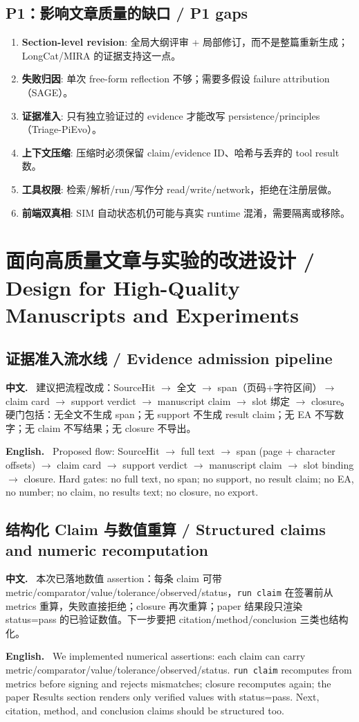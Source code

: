 \documentclass[UTF8,11pt]{ctexart}
\newcommand{\zh}{\par\noindent\textbf{中文.}\ }
\newcommand{\en}{\par\noindent\textbf{English.}\ }
\begin{document}
\subsection{P1：影响文章质量的缺口 / P1 gaps}
\begin{enumerate}[leftmargin=1.4em]
\item \textbf{Section-level revision}: 全局大纲评审 + 局部修订，而不是整篇重新生成；LongCat/MIRA 的证据支持这一点。
\item \textbf{失败归因}: 单次 free-form reflection 不够；需要多假设 failure attribution（SAGE）。
\item \textbf{证据准入}: 只有独立验证过的 evidence 才能改写 persistence/principles（Triage-PiEvo）。
\item \textbf{上下文压缩}: 压缩时必须保留 claim/evidence ID、哈希与丢弃的 tool result 数。
\item \textbf{工具权限}: 检索/解析/run/写作分 read/write/network，拒绝在注册层做。
\item \textbf{前端双真相}: SIM 自动状态机仍可能与真实 runtime 混淆，需要隔离或移除。
\end{enumerate}

\section{面向高质量文章与实验的改进设计 / Design for High-Quality Manuscripts and Experiments}

\subsection{证据准入流水线 / Evidence admission pipeline}
\zh
建议把流程改成：SourceHit $\rightarrow$ 全文 $\rightarrow$ span（页码+字符区间）$\rightarrow$ claim card $\rightarrow$ support verdict $\rightarrow$ manuscript claim $\rightarrow$ slot 绑定 $\rightarrow$ closure。硬门包括：无全文不生成 span；无 support 不生成 result claim；无 EA 不写数字；无 claim 不写结果；无 closure 不导出。
\en
Proposed flow: SourceHit $\rightarrow$ full text $\rightarrow$ span (page + character offsets) $\rightarrow$ claim card $\rightarrow$ support verdict $\rightarrow$ manuscript claim $\rightarrow$ slot binding $\rightarrow$ closure. Hard gates: no full text, no span; no support, no result claim; no EA, no number; no claim, no results text; no closure, no export.

\subsection{结构化 Claim 与数值重算 / Structured claims and numeric recomputation}
\zh
本次已落地数值 assertion：每条 claim 可带 metric/comparator/value/tolerance/observed/status，\texttt{run claim} 在签署前从 metrics 重算，失败直接拒绝；closure 再次重算；paper 结果段只渲染 status=pass 的已验证数值。下一步要把 citation/method/conclusion 三类也结构化。
\en
We implemented numerical assertions: each claim can carry metric/comparator/value/tolerance/observed/status. \texttt{run claim} recomputes from metrics before signing and rejects mismatches; closure recomputes again; the paper Results section renders only verified values with status=pass. Next, citation, method, and conclusion claims should be structured too.
\end{document}
